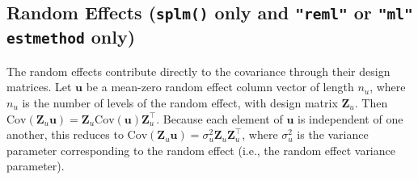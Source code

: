 \documentclass[10pt,letterpaper]{article}
\begin{document}
\hypertarget{random-effects-splm-only-and-reml-or-ml-estmethod-only}{%
\subsection{\texorpdfstring{Random Effects (\texttt{splm()} only and
\texttt{"reml"} or \texttt{"ml"} \texttt{estmethod}
only)}{Random Effects (splm() only and "reml" or "ml" estmethod only)}}\label{random-effects-splm-only-and-reml-or-ml-estmethod-only}}

The random effects contribute directly to the covariance through their
design matrices. Let \(\mathbf{u}\) be a mean-zero random effect column
vector of length \(n_u\), where \(n_u\) is the number of levels of the
random effect, with design matrix \(\mathbf{Z}_u\). Then
\(\text{Cov}(\mathbf{Z}_u\mathbf{u}) = \mathbf{Z}_u \text{Cov}(\mathbf{u})\mathbf{Z}_u^\top\).
Because each element of \(\mathbf{u}\) is independent of one another,
this reduces to
\(\text{Cov}(\mathbf{Z}_u\mathbf{u}) = \sigma^2_u \mathbf{Z}_u \mathbf{Z}_u^\top\),
where \(\sigma^2_u\) is the variance parameter corresponding to the
random effect (i.e., the random effect variance parameter).
\end{document}
